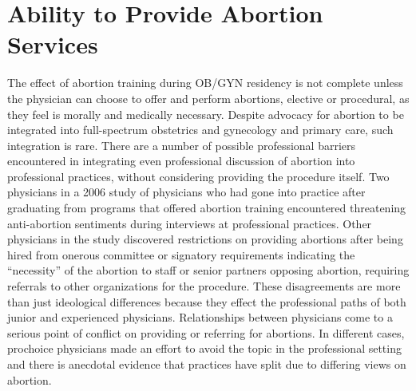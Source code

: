 \documentclass[letterpaper, 12pt]{article}
\begin{document}

\section*{Ability to Provide Abortion Services}

The effect of abortion training during OB/GYN residency is not complete unless the physician can choose to offer and perform abortions, elective or procedural, as they feel is morally and medically necessary.
Despite advocacy for abortion to be integrated into full-spectrum obstetrics and gynecology and primary care, such integration is rare. \autocite[pg. 146]{freedman_obstacles_2010} There are a number of possible professional barriers encountered in integrating even professional discussion of abortion into professional practices, without considering providing the procedure itself.
Two physicians in a 2006 study of physicians who had gone into practice after graduating from programs that offered abortion training encountered threatening anti-abortion sentiments during interviews at professional practices. \autocite[pg. 148]{freedman_obstacles_2010}
Other physicians in the study discovered restrictions on providing abortions after being hired from onerous committee or signatory requirements indicating the ``necessity'' of the abortion to staff or senior partners opposing abortion, requiring referrals to other organizations for the procedure. \autocite[pg. 148]{freedman_obstacles_2010}
These disagreements are more than just ideological differences because they effect the professional paths of both junior and experienced physicians. Relationships between physicians come to a serious point of conflict on providing or referring for abortions.
In different cases, prochoice physicians made an effort to avoid the topic in the professional setting and there is anecdotal evidence that practices have split due to differing views on abortion. \autocite[pg. 149]{freedman_obstacles_2010}
\end{document}
